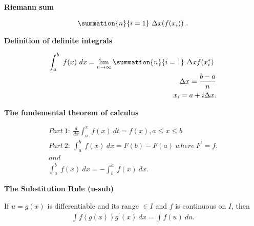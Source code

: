 \documentclass{report}
\begin{document}
      \pagebreak \bigbreak \noindent
      \begin{large}
          \textbf{Riemann sum}
      \end{large}
      \begin{align*}
          \summation{n}{i=1}\ \Delta x(f(x_{i}))\ 
      .\end{align*}

      \bigbreak \noindent \bigbreak \noindent 
      \begin{large}
          \textbf{Definition of definite integrals}
      \end{large}
      \begin{align*}
          \int_{a}^{b}\ f(x)\ dx = \lim\limits_{n \to \infty}{\summation{n}{i=1}\ \Delta xf(x_{i}^{*})\ } \\
          \Delta x = \frac{b-a}{n} \\
          x_{i} = a + i\Delta x
      .\end{align*}

          \bigbreak \noindent \bigbreak \noindent
          \begin{large}
              \textbf{The fundemental theorem of calculus}
          \end{large}
          \begin{align*}
            Part\ 1:\ \frac{d}{dx} \int_{a}^{x}\ f(x)\ dt  = f(x), a \leq x \leq b         \\
            Part\ 2:\ \int_{a}^{b}\ f(x)\ dx = F(b) - F(a)\ where\ F^{\prime} = f. \\
            and \\
            \int_{a}^{b}\ f(x)\ dx = -\int_{b}^{a}\ f(x)\ dx
          .\end{align*}
          \bigbreak \noindent \bigbreak \noindent
          \begin{large}
            \textbf{The Substitution Rule (u-sub)}
          \end{large}
          \bigbreak \noindent \bigbreak \noindent
          If $u=g(x)$ is differentiable and its range $\in I $ and $f $ is continuous on $I$, then
          \begin{align*}
            \int f(g(x))g^{\prime}(x)\ dx = \int f(u)\ du
          .\end{align*}
          \bigbreak \noindent \bigbreak \noindent
\end{document}
